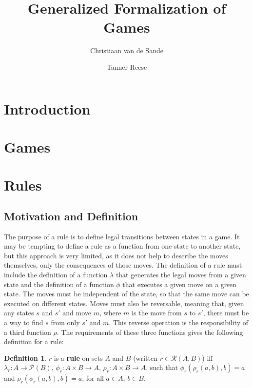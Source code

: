 \documentclass{article}
\title{Generalized Formalization of Games}
\author{Christiaan van de Sande \and Tanner Reese}
\theoremstyle{definition}
\newtheorem{definition}{Definition}[subsection]
\theoremstyle{plain}
\def\rule{\mathcal{R}}
\begin{document}
\maketitle

\section{Introduction}
 
\section{Games}

\section{Rules}

\subsection{Motivation and Definition} %

The purpose of a rule is to define legal transitions between states in a game.
It may be tempting to define a rule as a function from one state to another state, but this approach is very limited,
as it does not help to describe the moves themselves, only the consequences of those moves.
The definition of a rule must include
the definition of a function $ \lambda $ that generates the legal moves from a given state
and the definition of a function $ \phi $ that executes a given move on a given state.
The moves must be independent of the state, so that the same move can be executed on different states.
Moves must also be reversable,
meaning that, given any states $ s $ and $ s' $ and move $ m $,
where $ m $ is the move from $ s $ to $ s' $,
there must be a way to find $ s $ from only $ s' $ and $ m $.
This reverse operation is the responsibility of a third function $ \rho $.
The requirements of these three functions gives the following definition for a rule:

 \begin{definition}
  $ r $ is a \textbf{rule} on sets $ A $ and $ B $ (written  $ r \in \rule (A, B) $) iff
  $ \lambda_r : A          \rightarrow \mathcal{P} (B) $,
  $    \phi_r : A \times B \rightarrow A $,
  $    \rho_r : A \times B \rightarrow A $,
  such that $ \phi_r (\rho_r (a, b), b) = a $
  and $ \rho_r (\phi_r (a, b), b) = a $,
  for all $ a \in A $, $ b \in B $.
\end{definition}
\end{document}
